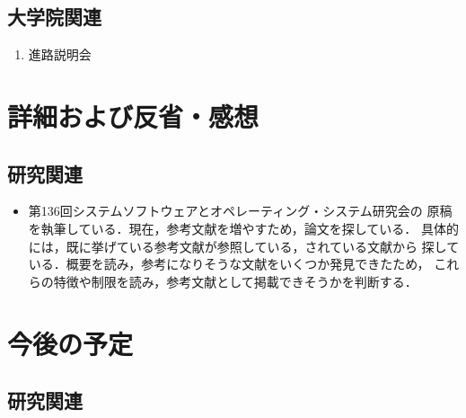 \documentclass[fleqn, 14pt]{extarticle}
\begin{document}
    \subsection{大学院関連}
    \label{sec2-3}
    \begin{enumerate}

        \item 進路説明会
            \hfill
            \label{enum-univ1}

    \end{enumerate}

    \section{詳細および反省・感想}
    \label{sec-3}

    \subsection{研究関連}
    \label{sec-3-2}

    \begin{itemize}

        \item[(\ref{enum-1-C})]
            \begin{spacing}{1.2}
            第136回システムソフトウェアとオペレーティング・システム研究会の
            原稿を執筆している．現在，参考文献を増やすため，論文を探している．
            具体的には，既に挙げている参考文献が参照している，されている文献から
            探している．概要を読み，参考になりそうな文献をいくつか発見できたため，
            これらの特徴や制限を読み，参考文献として掲載できそうかを判断する．
            \end{spacing}

    \end{itemize}

    \section{今後の予定}
    \label{sec-4}

    \subsection{研究関連}
    \label{sec-4-1}
\end{document}
